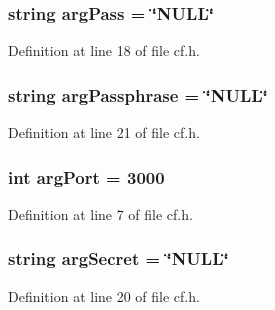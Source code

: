 \subsubsection[{\texorpdfstring{arg\+Pass}{argPass}}]{\setlength{\rightskip}{0pt plus 5cm}string arg\+Pass = \char`\"{}N\+U\+LL\char`\"{}}\hypertarget{class_k_1_1_c_f_a362e285d551ece07b51b724e25a7bc68}{}\label{class_k_1_1_c_f_a362e285d551ece07b51b724e25a7bc68}


Definition at line 18 of file cf.\+h.

\subsubsection[{\texorpdfstring{arg\+Passphrase}{argPassphrase}}]{\setlength{\rightskip}{0pt plus 5cm}string arg\+Passphrase = \char`\"{}N\+U\+LL\char`\"{}}\hypertarget{class_k_1_1_c_f_aab55dec94bd05605b7931510960734b6}{}\label{class_k_1_1_c_f_aab55dec94bd05605b7931510960734b6}


Definition at line 21 of file cf.\+h.

\subsubsection[{\texorpdfstring{arg\+Port}{argPort}}]{\setlength{\rightskip}{0pt plus 5cm}int arg\+Port = 3000}\hypertarget{class_k_1_1_c_f_ad8e21fbf694230c7356085f6a4c33946}{}\label{class_k_1_1_c_f_ad8e21fbf694230c7356085f6a4c33946}


Definition at line 7 of file cf.\+h.

\subsubsection[{\texorpdfstring{arg\+Secret}{argSecret}}]{\setlength{\rightskip}{0pt plus 5cm}string arg\+Secret = \char`\"{}N\+U\+LL\char`\"{}}\hypertarget{class_k_1_1_c_f_a7f00f6255755b37220ad45131ae0ad28}{}\label{class_k_1_1_c_f_a7f00f6255755b37220ad45131ae0ad28}


Definition at line 20 of file cf.\+h.

